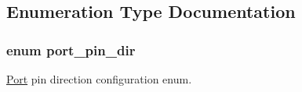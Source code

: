 \subsection{Enumeration Type Documentation}
\hypertarget{group__asfdoc__sam0__port__group_gabe12893c067f9b011ece79c1bf1b128a}{}
\subsubsection[{port\+\_\+pin\+\_\+dir}]{\setlength{\rightskip}{0pt plus 5cm}enum {\bf port\+\_\+pin\+\_\+dir}}\label{group__asfdoc__sam0__port__group_gabe12893c067f9b011ece79c1bf1b128a}


\hyperlink{struct_port}{Port} pin direction configuration enum. 

